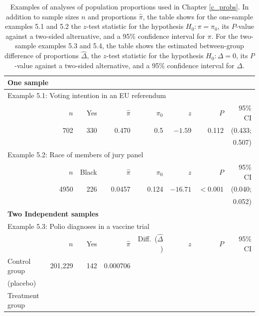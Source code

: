 \begin{table}[t]
\caption{Examples of analyses of population proportions used in Chapter
\ref{c_probs}. In addition to sample sizes $n$ and proportions
$\hat{\pi}$, the table shows for
the one-sample examples 5.1 and 5.2 the
$z$-test statistic for the
hypothesis $H_{0}: \pi=\pi_{0}$, its $P$-value against
a two-sided alternative, and a 95\% confidence interval for $\pi$.
For the two-sample examples 5.3 and 5.4, the table shows
the estimated between-group difference of proportions $\hat{\Delta}$,
the $z$-test statistic for the
hypothesis $H_{0}: \Delta=0$, its $P$-value against
a two-sided alternative, and a 95\% confidence interval for $\Delta$.
}
\label{t_probex}
\begin{small}
\begin{center}
\begin{tabular}{|lrrrrrrr|}\hline
\multicolumn{8}{|l|}{\rule[1mm]{0mm}{3mm}\textbf{One sample}} \\ \hline
\multicolumn{8}{|l|}{\rule[1mm]{0mm}{3mm}Example 5.1:
Voting intention in an EU referendum} \\
& $n$ & Yes & $\hat{\pi}$ & $\pi_{0}$ & $z$ & $P$ & 95\% CI \\ \hline
\rule[1mm]{0mm}{3mm} &
702 & 330 & 0.470 & 0.5 & $-1.59$ & 0.112 & (0.433;\\
& & & & & & & 0.507) \\ \hline
\multicolumn{8}{|l|}{\rule[1mm]{0mm}{3mm}Example 5.2: Race of members of jury panel} \\
& $n$ & Black & $\hat{\pi}$ & $\pi_{0}$ & $z$ & $P$ & 95\% CI \\ \hline
\rule[1mm]{0mm}{3mm} &
4950 & 226 & 0.0457 & 0.124& $-16.71$ & $<0.001$ & (0.040;\\
& & & & & & & 0.052) \\
\hline \hline
\multicolumn{8}{|l|}{\rule[1mm]{0mm}{3mm}\textbf{Two Independent samples}} \\ \hline
\multicolumn{8}{|l|}{\rule[1mm]{0mm}{3mm}Example 5.3: Polio diagnoses in a vaccine trial}\\
& $n$ & Yes & $\hat{\pi}$ & Diff.\ ($\hat{\Delta}$)& $z$ & $P$ & 95\% CI \\ \hline
\hspace*{.5em}\rule[1mm]{0mm}{3mm}Control group
& 201,229 & 142 & 0.000706 & & & &   \\
\hspace{.5em}(placebo) & & & & & & & \\
\hspace*{.5em}Treatment group

\end{tabular}
\end{center}
\end{small}
\end{table}
